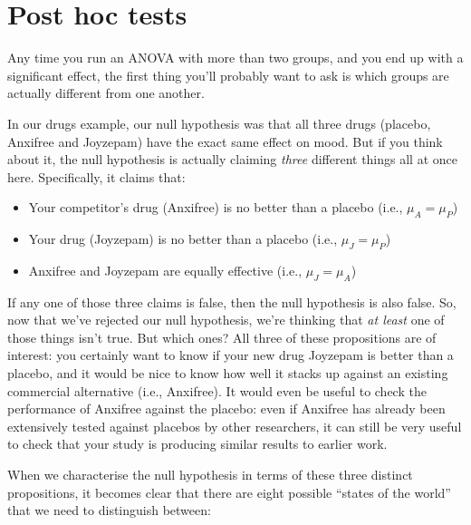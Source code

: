\documentclass[
]{book}
\providecommand{\tightlist}{%
  \setlength{\itemsep}{0pt}\setlength{\parskip}{0pt}}
\theoremstyle{definition}
\theoremstyle{definition}
\theoremstyle{definition}
\theoremstyle{definition}
\theoremstyle{remark}
\begin{document}
\hypertarget{posthoc}{%
\section{Post hoc tests}\label{posthoc}}

Any time you run an ANOVA with more than two groups, and you end up with a significant effect, the first thing you'll probably want to ask is which groups are actually different from one another.

In our drugs example, our null hypothesis was that all three drugs (placebo, Anxifree and Joyzepam) have the exact same effect on mood. But if you think about it, the null hypothesis is actually claiming \emph{three} different things all at once here. Specifically, it claims that:

\begin{itemize}
\tightlist
\item
  Your competitor's drug (Anxifree) is no better than a placebo (i.e., \(\mu_A = \mu_P\))
\item
  Your drug (Joyzepam) is no better than a placebo (i.e., \(\mu_J = \mu_P\))
\item
  Anxifree and Joyzepam are equally effective (i.e., \(\mu_J = \mu_A\))
\end{itemize}

If any one of those three claims is false, then the null hypothesis is also false. So, now that we've rejected our null hypothesis, we're thinking that \emph{at least} one of those things isn't true. But which ones? All three of these propositions are of interest: you certainly want to know if your new drug Joyzepam is better than a placebo, and it would be nice to know how well it stacks up against an existing commercial alternative (i.e., Anxifree). It would even be useful to check the performance of Anxifree against the placebo: even if Anxifree has already been extensively tested against placebos by other researchers, it can still be very useful to check that your study is producing similar results to earlier work.

When we characterise the null hypothesis in terms of these three distinct propositions, it becomes clear that there are eight possible ``states of the world'' that we need to distinguish between:
\end{document}
